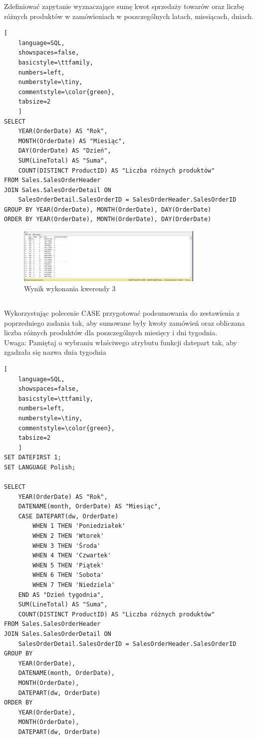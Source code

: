 \documentclass[a4paper,12pt]{article}
\begin{document}
Zdefiniować zapytanie wyznaczające sumę kwot sprzedaży towarów oraz liczbę różnych produktów w zamówieniach w poszczególnych latach, miesiącach, dniach.

\begin{lstlisting}[
    language=SQL,
    showspaces=false,
    basicstyle=\ttfamily,
    numbers=left,
    numberstyle=\tiny,
    commentstyle=\color{green},
    tabsize=2
    ]
SELECT 
    YEAR(OrderDate) AS "Rok", 
    MONTH(OrderDate) AS "Miesiąc", 
    DAY(OrderDate) AS "Dzień", 
    SUM(LineTotal) AS "Suma", 
    COUNT(DISTINCT ProductID) AS "Liczba różnych produktów"
FROM Sales.SalesOrderHeader
JOIN Sales.SalesOrderDetail ON 
    SalesOrderDetail.SalesOrderID = SalesOrderHeader.SalesOrderID
GROUP BY YEAR(OrderDate), MONTH(OrderDate), DAY(OrderDate)
ORDER BY YEAR(OrderDate), MONTH(OrderDate), DAY(OrderDate)
\end{lstlisting}

\begin{figure}[H]
    \centering
    \includegraphics[width=0.8\textwidth]{images/03.png}
    \caption{Wynik wykonania kwerendy 3}
\end{figure}

\subsection{}

Wykorzystując polecenie CASE przygotować podsumowania do zestawienia z poprzedniego zadania tak, aby sumowane były kwoty zamówień oraz obliczana liczba różnych produktów dla poszczególnych miesięcy i dni tygodnia.\\
Uwaga: Pamiętaj o wybraniu właściwego atrybutu funkcji datepart tak, aby zgadzała się nazwa dnia tygodnia

\begin{lstlisting}[
    language=SQL,
    showspaces=false,
    basicstyle=\ttfamily,
    numbers=left,
    numberstyle=\tiny,
    commentstyle=\color{green},
    tabsize=2
    ]
SET DATEFIRST 1;
SET LANGUAGE Polish;

SELECT 
    YEAR(OrderDate) AS "Rok", 
    DATENAME(month, OrderDate) AS "Miesiąc",     
    CASE DATEPART(dw, OrderDate)
        WHEN 1 THEN 'Poniedziałek'
        WHEN 2 THEN 'Wtorek'
        WHEN 3 THEN 'Środa'
        WHEN 4 THEN 'Czwartek'
        WHEN 5 THEN 'Piątek'
        WHEN 6 THEN 'Sobota'
        WHEN 7 THEN 'Niedziela'
    END AS "Dzień tygodnia", 
    SUM(LineTotal) AS "Suma", 
    COUNT(DISTINCT ProductID) AS "Liczba różnych produktów"
FROM Sales.SalesOrderHeader
JOIN Sales.SalesOrderDetail ON 
    SalesOrderDetail.SalesOrderID = SalesOrderHeader.SalesOrderID
GROUP BY 
    YEAR(OrderDate), 
    DATENAME(month, OrderDate),
    MONTH(OrderDate),
    DATEPART(dw, OrderDate)
ORDER BY 
    YEAR(OrderDate), 
    MONTH(OrderDate), 
    DATEPART(dw, OrderDate)
\end{lstlisting}
\end{document}
